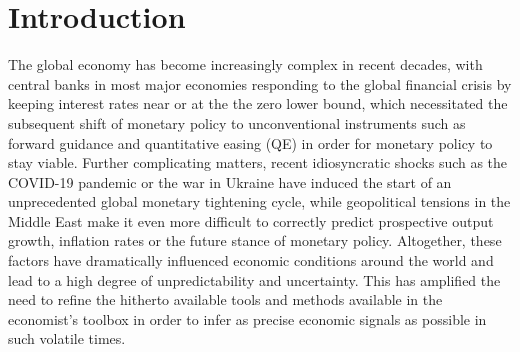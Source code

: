 \section{Introduction}
\label{sec:intro}


The global economy has become increasingly complex in recent decades, with central banks in most major economies responding to the global financial crisis by keeping interest rates near or at the the zero lower bound, which necessitated the subsequent shift of monetary policy to unconventional instruments such as forward guidance and quantitative easing (QE) in order for monetary policy to stay viable. 
Further complicating matters, recent idiosyncratic shocks such as the COVID-19 pandemic or the war in Ukraine have induced the start of an unprecedented global monetary tightening cycle, while geopolitical tensions in the Middle East make it even more difficult to correctly predict prospective output growth, inflation rates or the future stance of monetary policy. 
Altogether, these factors have dramatically influenced economic conditions around the world and lead to a high degree of unpredictability and uncertainty. 
This has amplified the need to refine the hitherto available tools and methods available in the economist's toolbox in order to infer as precise economic signals as possible in such volatile times.

